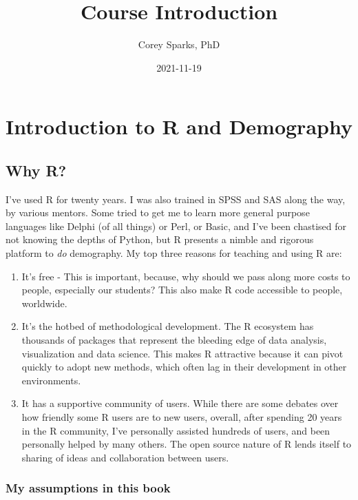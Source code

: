 \documentclass[
]{book}
\title{Course Introduction}
\author{Corey Sparks, PhD}
\date{2021-11-19}
\begin{document}
\maketitle

{
\setcounter{tocdepth}{1}
\tableofcontents
}
\hypertarget{introduction-to-r-and-demography}{%
\chapter{Introduction to R and Demography}\label{introduction-to-r-and-demography}}

\hypertarget{why-r}{%
\section{Why R?}\label{why-r}}

I've used R for twenty years. I was also trained in SPSS and SAS along
the way, by various mentors. Some tried to get me to learn more general
purpose languages like Delphi (of all things) or Perl, or Basic, and
I've been chastised for not knowing the depths of Python, but R presents
a nimble and rigorous platform to \emph{do} demography. My top three reasons
for teaching and using R are:

\begin{enumerate}
\def\labelenumi{\arabic{enumi}.}
\item
  It's free - This is important, because, why should we pass along
  more costs to people, especially our students? This also make R code
  accessible to people, worldwide.
\item
  It's the hotbed of methodological development. The R ecosystem has
  thousands of packages that represent the bleeding edge of data
  analysis, visualization and data science. This makes R attractive
  because it can pivot quickly to adopt new methods, which often lag
  in their development in other environments.
\item
  It has a supportive community of users. While there are some debates
  over how friendly some R users are to new users, overall, after
  spending 20 years in the R community, I've personally assisted
  hundreds of users, and been personally helped by many others. The
  open source nature of R lends itself to sharing of ideas and
  collaboration between users.
\end{enumerate}

\hypertarget{my-assumptions-in-this-book}{%
\subsection{My assumptions in this book}\label{my-assumptions-in-this-book}}
\end{document}
